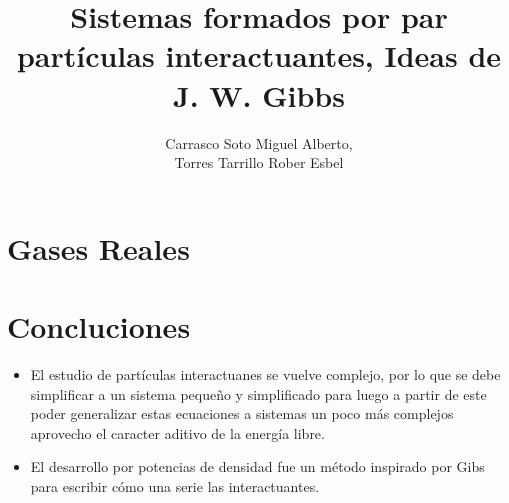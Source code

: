 \documentclass[12pt, a4paper]{article}
\title{Sistemas formados por par partículas interactuantes, Ideas de J. W. Gibbs}
\author{Carrasco Soto Miguel Alberto, \\Torres Tarrillo Rober Esbel}
\begin{document}
\maketitle
\tableofcontents

\newpage


\section{Gases Reales}



\section{Concluciones}

\begin{itemize}
\item El estudio de partículas interactuanes se vuelve complejo, por lo que
se debe simplificar a un sistema pequeño y simplificado para luego a partir
de este poder generalizar estas ecuaciones a sistemas un poco más complejos
aprovecho el caracter aditivo de la energía libre.

\item El desarrollo por potencias de densidad fue un método inspirado por
Gibs para escribir cómo una serie las interactuantes.
\end{itemize}


\printbibliography 
\end{document}
